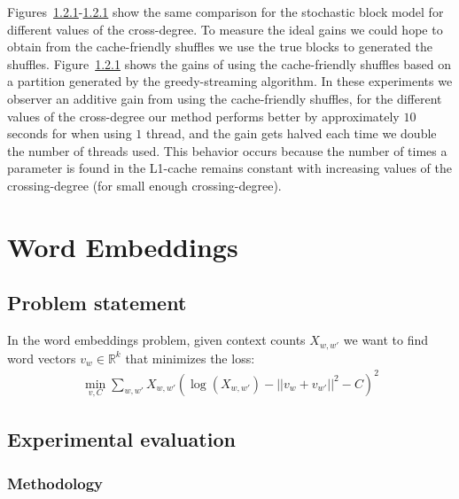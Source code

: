 \documentclass[times,11pt]{article}
\numberwithin{equation}{section}		%
\numberwithin{figure}{section}			%
\numberwithin{table}{section}				%
\newcommand{\ltwonorm}[1]{\left|\left|{#1}\right|\right|}
\begin{document}
Figures~\ref{}-\ref{} show the same comparison for the stochastic block model for different values of the cross-degree. To measure the ideal gains we could hope to obtain from the 
cache-friendly shuffles we use the true blocks to generated the shuffles. Figure~\ref{} shows the gains of using the cache-friendly shuffles based on a partition generated by the greedy-streaming 
algorithm. In these experiments we observer an additive gain from using the cache-friendly shuffles, for the different values of the cross-degree our method performs better by approximately $10$ seconds for when using $1$ thread, and the gain gets halved each time we double the number of threads used. This behavior occurs because the number of times a parameter is found in the L1-cache remains constant with increasing values of the crossing-degree (for small enough crossing-degree). 




\section{Word Embeddings}\label{sec:w2v}

\subsection{Problem statement}
In the word embeddings problem, given context counts $X_{w,w'}$ we want to find word vectors
$v_{w} \in \mathbb{R}^{k}$ that minimizes the loss:
\begin{align*}
\min_{v,C}\sum_{w,w'}X_{w,w'} \left(\log(X_{w,w'}) - \ltwonorm{v_w+v_{w'}}^2 - C\right)^2
\end{align*}

\subsection{Experimental evaluation}
\subsubsection{Methodology}
\end{document}

